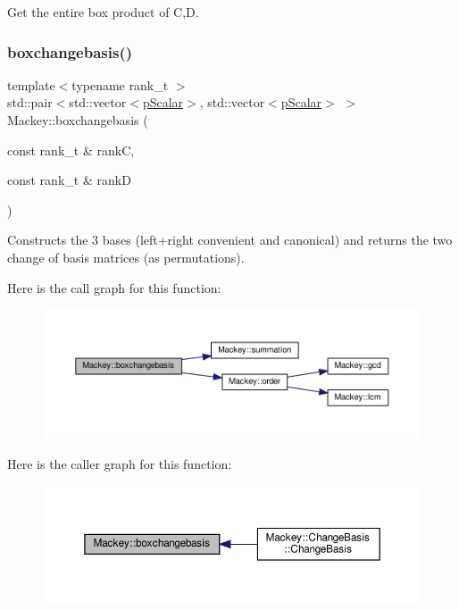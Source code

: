 Get the entire box product of C,D. 

\mbox{\label{namespaceMackey_a90ea60504ffb74da3a53875368225f8f}} 
\subsubsection{\texorpdfstring{boxchangebasis()}{boxchangebasis()}}
{\footnotesize\ttfamily template$<$typename rank\+\_\+t $>$ \\
std\+::pair$<$std\+::vector$<$\hyperlink{namespaceMackey_a4f147e328c520f568f5d3adf1c75f514}{p\+Scalar}$>$, std\+::vector$<$\hyperlink{namespaceMackey_a4f147e328c520f568f5d3adf1c75f514}{p\+Scalar}$>$ $>$ Mackey\+::boxchangebasis (\begin{DoxyParamCaption}\item[{const rank\+\_\+t \&}]{rankC,  }\item[{const rank\+\_\+t \&}]{rankD }\end{DoxyParamCaption})}



Constructs the 3 bases (left+right convenient and canonical) and returns the two change of basis matrices (as permutations). 

Here is the call graph for this function\+:\nopagebreak
\begin{figure}[H]
\begin{center}
\leavevmode
\includegraphics[width=350pt]{namespaceMackey_a90ea60504ffb74da3a53875368225f8f_cgraph}
\end{center}
\end{figure}
Here is the caller graph for this function\+:\nopagebreak
\begin{figure}[H]
\begin{center}
\leavevmode
\includegraphics[width=350pt]{namespaceMackey_a90ea60504ffb74da3a53875368225f8f_icgraph}
\end{center}
\end{figure}
\mbox{\label{namespaceMackey_acfe96d099f378714f3383db219c525ec}} 
